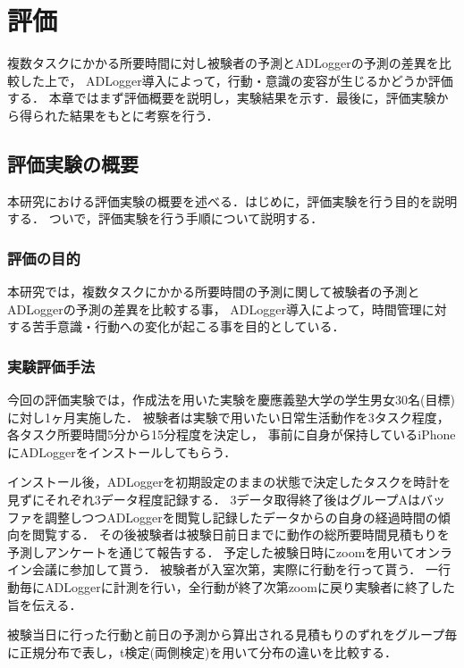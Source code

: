 \chapter{評価}
複数タスクにかかる所要時間に対し被験者の予測とADLoggerの予測の差異を比較した上で，
ADLogger導入によって，行動・意識の変容が生じるかどうか評価する．
本章ではまず評価概要を説明し，実験結果を示す．最後に，評価実験から得られた結果をもとに考察を行う．

\section{評価実験の概要}
本研究における評価実験の概要を述べる．はじめに，評価実験を行う目的を説明する．
ついで，評価実験を行う手順について説明する．

\subsection{評価の目的}
本研究では，複数タスクにかかる所要時間の予測に関して被験者の予測とADLoggerの予測の差異を比較する事，
ADLogger導入によって，時間管理に対する苦手意識・行動への変化が起こる事を目的としている．

\subsection{実験評価手法}
今回の評価実験では，作成法\cite{Oguro1961}\cite{Tayama2018}を用いた実験を慶應義塾大学の学生男女30名(目標)に対し1ヶ月実施した．
被験者は実験で用いたい日常生活動作を3タスク程度，各タスク所要時間5分から15分程度を決定し，
事前に自身が保持しているiPhoneにADLoggerをインストールしてもらう．


インストール後，ADLoggerを初期設定のままの状態で決定したタスクを時計を見ずにそれぞれ3データ程度記録する．
3データ取得終了後はグループAはバッファを調整しつつADLoggerを閲覧し記録したデータからの自身の経過時間の傾向を閲覧する．
その後被験者は被験日前日までに動作の総所要時間見積もりを予測しアンケートを通じて報告する．
予定した被験日時にzoom\cite{zoom}を用いてオンライン会議に参加して貰う．
被験者が入室次第，実際に行動を行って貰う．
一行動毎にADLoggerに計測を行い，全行動が終了次第zoomに戻り実験者に終了した旨を伝える．

被験当日に行った行動と前日の予測から算出される見積もりのずれをグループ毎に正規分布で表し，t検定(両側検定)を用いて分布の違いを比較する．

